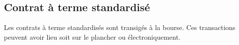 \documentclass[10pt, french]{article}
\begin{document}
\begin{multicols*}{2}
\columnbreak

\subsection{Contrat à terme standardisé}

Les contrats à terme standardisés sont transigés à la bourse. Ces transactions peuvent avoir lieu soit sur le plancher ou électroniquement.


\end{multicols*}
\end{document}
